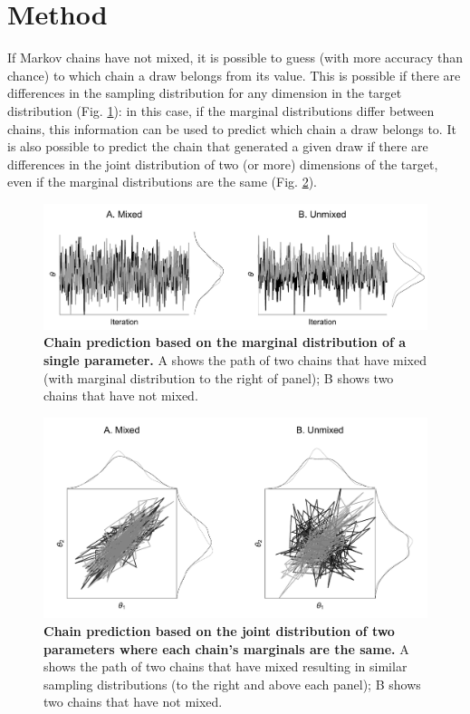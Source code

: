 \documentclass[ba]{imsart}
\numberwithin{equation}{section}
\theoremstyle{plain}
\begin{document}
	
	\section{Method}\label{sec:method}
	If Markov chains have not mixed, it is possible to guess (with more accuracy than chance) to which chain a draw belongs from its value. This is possible if there are differences in the sampling distribution for any dimension in the target distribution (Fig. \ref{fig:marginal}): in this case, if the marginal distributions differ between chains, this information can be used to predict which chain a draw belongs to. It  is also possible to predict the chain that generated a given draw if there are differences in the joint distribution of two (or more) dimensions of the target, even if the marginal distributions are the same (Fig. \ref{fig:joint}).
	
	\begin{figure}[!htb]
		\centerline{\includegraphics[width=1.0\textwidth]{unmixed_1.pdf}}
		\caption{\textbf{Chain prediction based on the marginal distribution of a single parameter.} A shows the path of two chains that have mixed (with marginal distribution to the right of panel); B shows two chains that have not mixed.}
		\label{fig:marginal}
	\end{figure}
	
	
\begin{figure}[h]
	\centerline{\includegraphics[width=1.0\textwidth]{unmixed_2.pdf}}
	\caption{\textbf{Chain prediction based on the joint distribution of two parameters where each chain's marginals are the same.} A shows the path of two chains that have mixed resulting in similar sampling distributions (to the right and above each panel); B shows two chains that have not mixed.}
	\label{fig:joint}
\end{figure}
\end{document}
